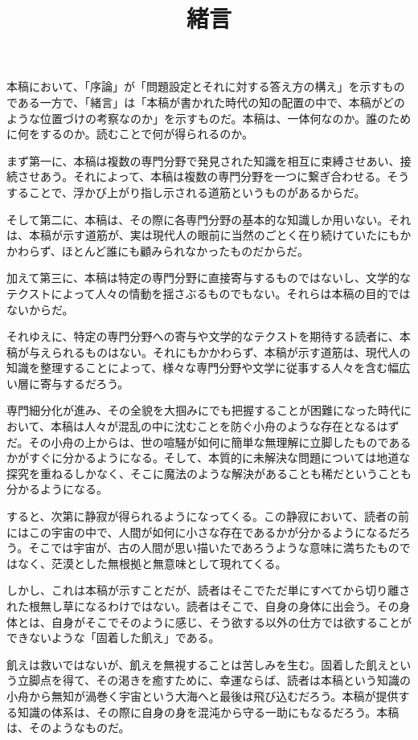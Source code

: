\documentclass[8pt, a5paper]{ltjsarticle}
\title{緒言}
\author{}
\date{}
\begin{document}
\maketitle

本稿において、「序論」が「問題設定とそれに対する答え方の構え」を示すものである一方で、「緒言」は「本稿が書かれた時代の知の配置の中で、本稿がどのような位置づけの考察なのか」を示すものだ。本稿は、一体何なのか。誰のために何をするのか。読むことで何が得られるのか。

まず第一に、本稿は複数の専門分野で発見された知識を相互に束縛させあい、接続させあう。それによって、本稿は複数の専門分野を一つに繋ぎ合わせる。そうすることで、浮かび上がり指し示される道筋というものがあるからだ。

そして第二に、本稿は、その際に各専門分野の基本的な知識しか用いない。それは、本稿が示す道筋が、実は現代人の眼前に当然のごとく在り続けていたにもかかわらず、ほとんど誰にも顧みられなかったものだからだ。

加えて第三に、本稿は特定の専門分野に直接寄与するものではないし、文学的なテクストによって人々の情動を揺さぶるものでもない。それらは本稿の目的ではないからだ。

それゆえに、特定の専門分野への寄与や文学的なテクストを期待する読者に、本稿が与えられるものはない。それにもかかわらず、本稿が示す道筋は、現代人の知識を整理することによって、様々な専門分野や文学に従事する人々を含む幅広い層に寄与するだろう。

専門細分化が進み、その全貌を大掴みにでも把握することが困難になった時代において、本稿は人々が混乱の中に沈むことを防ぐ小舟のような存在となるはずだ。その小舟の上からは、世の喧騒が如何に簡単な無理解に立脚したものであるかがすぐに分かるようになる。そして、本質的に未解決な問題については地道な探究を重ねるしかなく、そこに魔法のような解決があることも稀だということも分かるようになる。

すると、次第に静寂が得られるようになってくる。この静寂において、読者の前にはこの宇宙の中で、人間が如何に小さな存在であるかが分かるようになるだろう。そこでは宇宙が、古の人間が思い描いたであろうような意味に満ちたものではなく、茫漠とした無根拠と無意味として現れてくる。

しかし、これは本稿が示すことだが、読者はそこでただ単にすべてから切り離された根無し草になるわけではない。読者はそこで、自身の身体に出会う。その身体とは、自身がそこでそのように感じ、そう欲する以外の仕方では欲することができないような「固着した飢え」である。

飢えは救いではないが、飢えを無視することは苦しみを生む。固着した飢えという立脚点を得て、その渇きを癒すために、幸運ならば、読者は本稿という知識の小舟から無知が渦巻く宇宙という大海へと最後は飛び込むだろう。本稿が提供する知識の体系は、その際に自身の身を混沌から守る一助にもなるだろう。本稿は、そのようなものだ。
\end{document}
